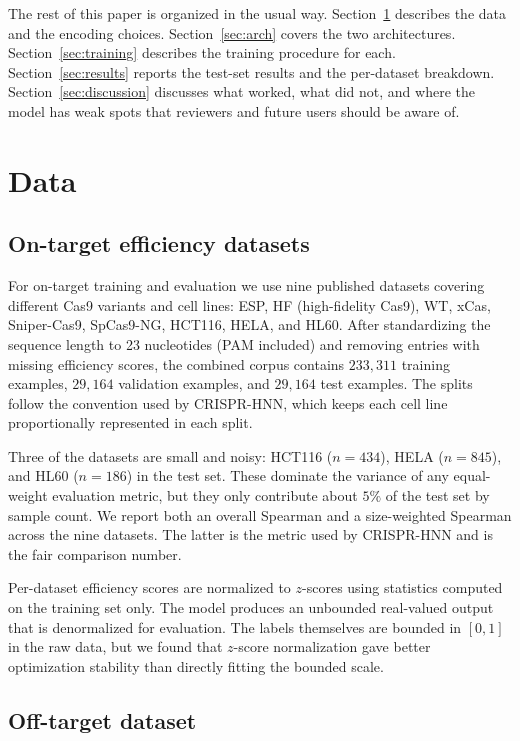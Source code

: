 \documentclass[11pt,a4paper]{article}
\begin{document}
The rest of this paper is organized in the usual way. Section~\ref{sec:data} describes the data and the encoding choices. Section~\ref{sec:arch} covers the two architectures. Section~\ref{sec:training} describes the training procedure for each. Section~\ref{sec:results} reports the test-set results and the per-dataset breakdown. Section~\ref{sec:discussion} discusses what worked, what did not, and where the model has weak spots that reviewers and future users should be aware of.

\section{Data}
\label{sec:data}

\subsection{On-target efficiency datasets}

For on-target training and evaluation we use nine published datasets covering different Cas9 variants and cell lines: ESP, HF (high-fidelity Cas9), WT, xCas, Sniper-Cas9, SpCas9-NG, HCT116, HELA, and HL60. After standardizing the sequence length to 23 nucleotides (PAM included) and removing entries with missing efficiency scores, the combined corpus contains $233{,}311$ training examples, $29{,}164$ validation examples, and $29{,}164$ test examples. The splits follow the convention used by CRISPR-HNN, which keeps each cell line proportionally represented in each split.

Three of the datasets are small and noisy: HCT116 ($n{=}434$), HELA ($n{=}845$), and HL60 ($n{=}186$) in the test set. These dominate the variance of any equal-weight evaluation metric, but they only contribute about $5\%$ of the test set by sample count. We report both an overall Spearman and a size-weighted Spearman across the nine datasets. The latter is the metric used by CRISPR-HNN and is the fair comparison number.

Per-dataset efficiency scores are normalized to $z$-scores using statistics computed on the training set only. The model produces an unbounded real-valued output that is denormalized for evaluation. The labels themselves are bounded in $[0,1]$ in the raw data, but we found that $z$-score normalization gave better optimization stability than directly fitting the bounded scale.

\subsection{Off-target dataset}
\end{document}
